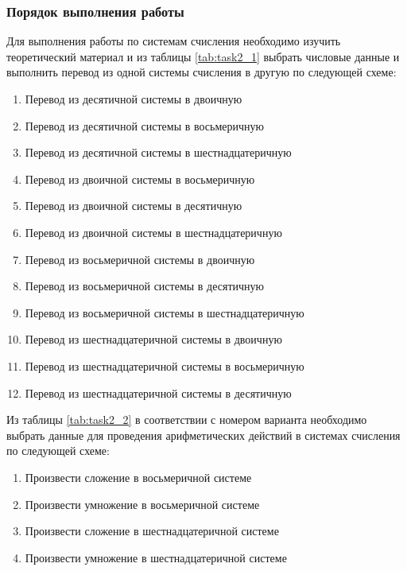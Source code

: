 \subsubsection{Порядок выполнения работы}

Для выполнения работы по системам счисления необходимо изучить теоретический материал и из таблицы \ref{tab:task2_1} выбрать числовые данные и выполнить перевод из одной системы счисления в другую по следующей схеме:
\begin{enumerate}
  \item Перевод из десятичной системы в двоичную
  \item Перевод из десятичной системы в восьмеричную
  \item Перевод из десятичной системы в шестнадцатеричную
  \item Перевод из двоичной системы в восьмеричную
  \item Перевод из двоичной системы в десятичную
  \item Перевод из двоичной системы в шестнадцатеричную
  \item Перевод из восьмеричной системы в двоичную
  \item Перевод из восьмеричной системы в десятичную
  \item Перевод из восьмеричной системы в шестнадцатеричную
  \item Перевод из шестнадцатеричной системы в двоичную
  \item Перевод из шестнадцатеричной системы в восьмеричную
  \item Перевод из шестнадцатеричной системы в десятичную
\end{enumerate}
Из таблицы \ref{tab:task2_2} в соответствии с номером варианта необходимо выбрать данные для проведения арифметических действий в системах счисления по следующей схеме:
\begin{enumerate}
  \item Произвести сложение в восьмеричной системе
  \item Произвести умножение в восьмеричной системе
  \item Произвести сложение в шестнадцатеричной системе
  \item Произвести умножение в шестнадцатеричной системе
\end{enumerate}

